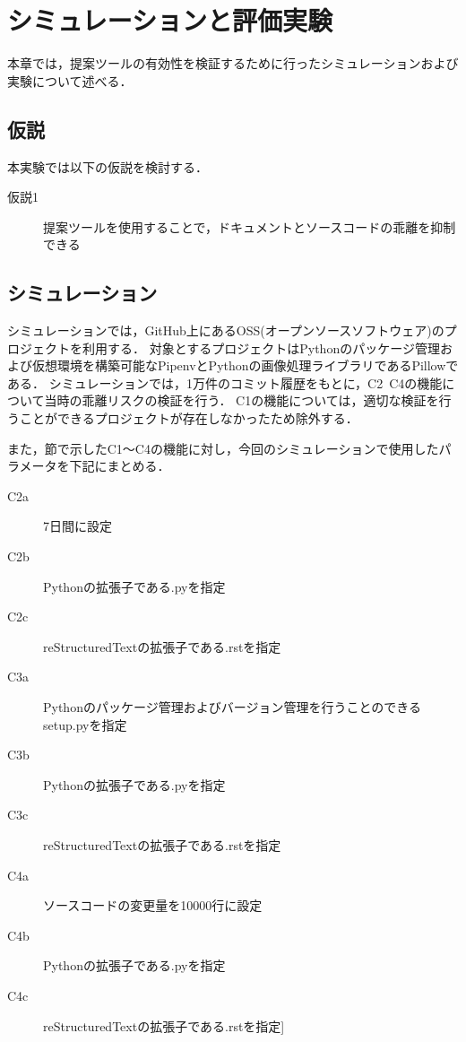 \chapter{シミュレーションと評価実験}
本章では，提案ツールの有効性を検証するために行ったシミュレーションおよび実験について述べる．

\section{仮説}
本実験では以下の仮説を検討する．

\begin{description}
    \item[仮説1] 提案ツールを使用することで，ドキュメントとソースコードの乖離を抑制できる
\end{description}

\section{シミュレーション}
\label{sim}
シミュレーションでは，GitHub上にあるOSS(オープンソースソフトウェア)のプロジェクトを利用する．
対象とするプロジェクトはPythonのパッケージ管理および仮想環境を構築可能なPipenv\cite{pipenv}とPythonの画像処理ライブラリであるPillow\cite{pillow}である．
シミュレーションでは，1万件のコミット履歴をもとに，C2~C4の機能について当時の乖離リスクの検証を行う．
C1の機能については，適切な検証を行うことができるプロジェクトが存在しなかったため除外する．

また，\label{tool}節で示したC1〜C4の機能に対し，今回のシミュレーションで使用したパラメータを下記にまとめる．
\begin{description}
    \item[C2a] 7日間に設定
    \item[C2b] Pythonの拡張子である.pyを指定
    \item[C2c] reStructuredTextの拡張子である.rstを指定 
    \item[C3a] Pythonのパッケージ管理およびバージョン管理を行うことのできるsetup.pyを指定
    \item[C3b] Pythonの拡張子である.pyを指定
    \item[C3c] reStructuredTextの拡張子である.rstを指定
    \item[C4a] ソースコードの変更量を10000行に設定
    \item[C4b] Pythonの拡張子である.pyを指定
    \item[C4c] reStructuredTextの拡張子である.rstを指定] 
\end{description}

